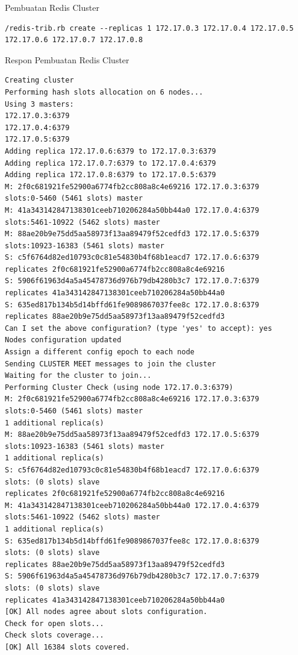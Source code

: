 \begin{listing}[!]
	\caption{Pembuatan Redis Cluster}
	\label{lst:redis_trib_cluster}
	\begin{verbatim}
/redis-trib.rb create --replicas 1 172.17.0.3 172.17.0.4 172.17.0.5 172.17.0.6 172.17.0.7 172.17.0.8
	\end{verbatim}
\end{listing}


\begin{listing}[!]
	\caption{Respon Pembuatan Redis Cluster}
	\label{lst:redis_trib_cluster_response}
	\begin{verbatim}
Creating cluster
Performing hash slots allocation on 6 nodes...
Using 3 masters:
172.17.0.3:6379
172.17.0.4:6379
172.17.0.5:6379
Adding replica 172.17.0.6:6379 to 172.17.0.3:6379
Adding replica 172.17.0.7:6379 to 172.17.0.4:6379
Adding replica 172.17.0.8:6379 to 172.17.0.5:6379
M: 2f0c681921fe52900a6774fb2cc808a8c4e69216 172.17.0.3:6379
slots:0-5460 (5461 slots) master
M: 41a343142847138301ceeb710206284a50bb44a0 172.17.0.4:6379
slots:5461-10922 (5462 slots) master
M: 88ae20b9e75dd5aa58973f13aa89479f52cedfd3 172.17.0.5:6379
slots:10923-16383 (5461 slots) master
S: c5f6764d82ed10793c0c81e54830b4f68b1eacd7 172.17.0.6:6379
replicates 2f0c681921fe52900a6774fb2cc808a8c4e69216
S: 5906f61963d4a5a45478736d976b79db4280b3c7 172.17.0.7:6379
replicates 41a343142847138301ceeb710206284a50bb44a0
S: 635ed817b134b5d14bffd61fe9089867037fee8c 172.17.0.8:6379
replicates 88ae20b9e75dd5aa58973f13aa89479f52cedfd3
Can I set the above configuration? (type 'yes' to accept): yes
Nodes configuration updated
Assign a different config epoch to each node
Sending CLUSTER MEET messages to join the cluster
Waiting for the cluster to join...
Performing Cluster Check (using node 172.17.0.3:6379)
M: 2f0c681921fe52900a6774fb2cc808a8c4e69216 172.17.0.3:6379
slots:0-5460 (5461 slots) master
1 additional replica(s)
M: 88ae20b9e75dd5aa58973f13aa89479f52cedfd3 172.17.0.5:6379
slots:10923-16383 (5461 slots) master
1 additional replica(s)
S: c5f6764d82ed10793c0c81e54830b4f68b1eacd7 172.17.0.6:6379
slots: (0 slots) slave
replicates 2f0c681921fe52900a6774fb2cc808a8c4e69216
M: 41a343142847138301ceeb710206284a50bb44a0 172.17.0.4:6379
slots:5461-10922 (5462 slots) master
1 additional replica(s)
S: 635ed817b134b5d14bffd61fe9089867037fee8c 172.17.0.8:6379
slots: (0 slots) slave
replicates 88ae20b9e75dd5aa58973f13aa89479f52cedfd3
S: 5906f61963d4a5a45478736d976b79db4280b3c7 172.17.0.7:6379
slots: (0 slots) slave
replicates 41a343142847138301ceeb710206284a50bb44a0
[OK] All nodes agree about slots configuration.
Check for open slots...
Check slots coverage...
[OK] All 16384 slots covered.
	\end{verbatim}
\end{listing}


